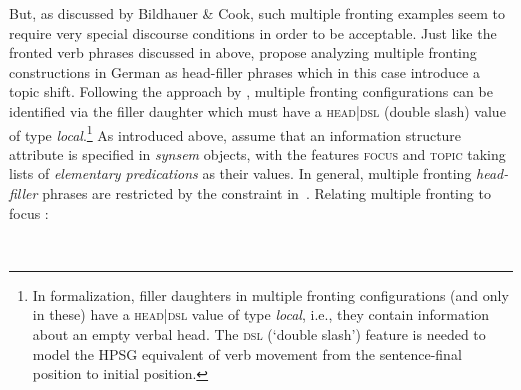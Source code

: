 \documentclass[output=paper
                ,modfonts
                ,nonflat
	        ,collection
	        ,collectionchapter
	        ,collectiontoclongg
 	        ,biblatex
                ,babelshorthands
                ,newtxmath
                ,draftmode
                ,colorlinks, citecolor=brown
]{./langsci/langscibook}
\begin{document}
But, as discussed by Bildhauer \& Cook, such multiple fronting
examples seem to require very special discourse conditions in order to
be acceptable. Just like the fronted verb phrases discussed in
\cite{dKM2003a} above, \cite{BC2010a} propose
analyzing multiple fronting constructions in German as head-filler
phrases which in this case introduce a topic shift. Following the
approach by \cite{Mueller2005d-unlinked}, multiple fronting
configurations can be identified via the filler daughter which must
have a \textsc{head|dsl} (double slash) value of type
\textit{local}.\footnote{In  formalization, filler daughters in multiple fronting configurations (and only in these) have a  \textsc{head|dsl} value of type \textit{local}, i.e., they contain information about an empty verbal head. The \textsc{dsl} (‘double slash’) feature is needed to model the HPSG equivalent of verb movement from the sentence-final position to initial position. } As introduced above, \cite{BC2010a} assume that an
information structure attribute is specified in \textit{synsem}
objects, with the features \textsc{focus} and \textsc{topic} taking
lists of \textit{elementary predications} as their values. In general,
multiple fronting \textit{head-filler} phrases are restricted by the
constraint in~.
\ea
Relating multiple fronting to focus \citep[75]{BC2010a}:\\
    \begin{avm}
    \end{avm}
\impl\ 
  \begin{avm}
  \end{avm}
\end{document}
